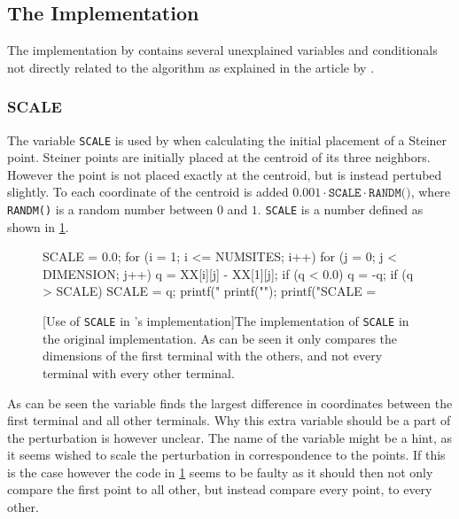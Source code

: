 \subsection{The Implementation}
\label{sec:implementation}

The implementation by \citeauthor{smith1992} contains several unexplained variables and conditionals not
directly related to the algorithm as explained in the article by \textcite{smith1992}.

\subsubsection{SCALE}
\label{sec:scale}

The variable \texttt{SCALE} is used by \citeauthor{smith1992} when calculating the initial
placement of a Steiner point. Steiner points are initially placed at the
centroid of its three neighbors. However the point is not placed exactly at the
centroid, but is instead pertubed slightly. To each coordinate of the centroid
is added $0.001 \cdot \texttt{SCALE} \cdot \texttt{RANDM()}$, where \texttt{RANDM()} is a
random number between $0$ and $1$. \texttt{SCALE} is a number defined as shown
in \cref{fig:randm}.

\begin{figure}[htbp]
\begin{c-code}
SCALE = 0.0;
for (i = 1; i <= NUMSITES; i++) {
  for (j = 0; j < DIMENSION; j++) {
    q = XX[i][j] - XX[1][j];
    if (q < 0.0) q = -q;
    if (q > SCALE) SCALE = q;
    printf(" %
  }
  printf("\n");
}
printf("SCALE = %
\end{c-code}
  [Use of \texttt{SCALE} in \citeauthor{smith1992}'s implementation]{The implementation
    of \texttt{SCALE} in the original implementation. As can be seen it only
    compares the dimensions of the first terminal with the others, and not every
    terminal with every other terminal.\label{fig:randm}}
\end{figure}

As can be seen the variable finds the largest difference in coordinates between the first
terminal and all other terminals. Why this extra variable should be a part of
the perturbation is however unclear. The name of the variable might be a hint,
as it seems \citeauthor{smith1992} wished to scale the perturbation in correspondence to the
points. If this is the case however the code in \cref{fig:randm} seems to be
faulty as it should then not only compare the first point to all other, but
instead compare every point, to every other.

